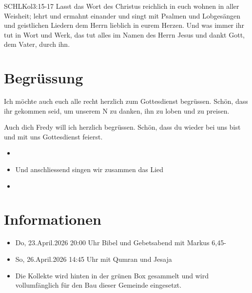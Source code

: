 \documentclass[14pt]{../../inc/mybib}
\newcommand{\Name}{Fredy}
\begin{document}
\begin{bibelbox}{SCHL}{Kol}{3:15-17}
    Lasst das Wort des Christus reichlich in euch wohnen in aller Weisheit; lehrt und ermahnt einander und singt mit Psalmen und Lobgesängen und geistlichen Liedern dem Herrn lieblich in eurem Herzen. Und was immer ihr tut in Wort und Werk, das tut alles im Namen des Herrn Jesus und dankt Gott, dem Vater, durch ihn.
\end{bibelbox}
\section{Begrüssung}
Ich möchte auch euch alle recht herzlich zum Gottesdienst begrüssen. Schön, dass ihr gekommen seid, um unserem \herr N zu danken, ihn zu loben und zu preisen.

Auch dich \Name{} will ich herzlich begrüssen. Schön, dass du wieder bei uns bist und mit uns Gottesdienst feierst.
\begin{itemize}
    \item[] \beten{}
    \item[] Und anschliessend singen wir zusammen das Lied
    \item[] 
\end{itemize}

\section{Informationen}
\begin{itemize}
    \item {} Do, 23.April.2026 20:00 Uhr Bibel und Gebetsabend mit  Markus 6,45-
    \item {} So, 26.April.2026 14:45 Uhr mit Qumran und Jesaja        
    \item {} Die Kollekte wird hinten in der grünen Box gesammelt und wird vollumfänglich für den Bau dieser Gemeinde eingesetzt.
\end{itemize}
\end{document}
